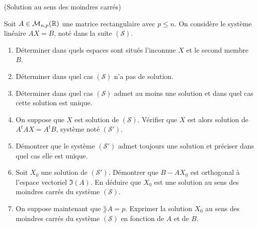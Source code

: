 \documentclass[a4paper,12pt,reqno]{amsart}
\begin{document}
\begin{exo} (Solution au sens des moindres carrés)

    Soit $A\in {\mathcal M}_{n,p}(\mathbb{R})$ une matrice rectangulaire avec $p \leq n$. On considère le système linéaire $AX=B$, noté dans la suite $({\mathcal S})$.
    \begin{enumerate}
        \item Déterminer dans quels espaces sont situés l'inconnue $X$ et le second membre $B$.

        \item Déterminer dans quel cas $({\mathcal S})$ n'a pas de solution.

        \item Déterminer dans quel cas $({\mathcal S})$ admet au moins une solution et dans quel cas cette solution est unique.

        \item On suppose que $X$ est solution de $({\mathcal S})$. Vérifier que $X$ est alors solution de $A^tAX=A^tB$, système noté $({\mathcal S}')$.

        \item Démontrer que le système $({\mathcal S}')$ admet toujours une solution et préciser dans quel cas elle est unique.

        \item Soit $X_0$ une solution de $({\mathcal S}')$. Démontrer que $B-AX_0$ est orthogonal à l'espace vectoriel $\Im(A)$. En déduire que $X_0$ est une solution au sens des moindres carrés du système $({\mathcal S})$.

        \item On suppose maintenant que $\rang A = p$. Exprimer la solution $X_{0}$ au sens des moindres carrés du système $({\mathcal S})$ en fonction de $A$ et de $B$.

    \end{enumerate}
\end{exo}
\end{document}
